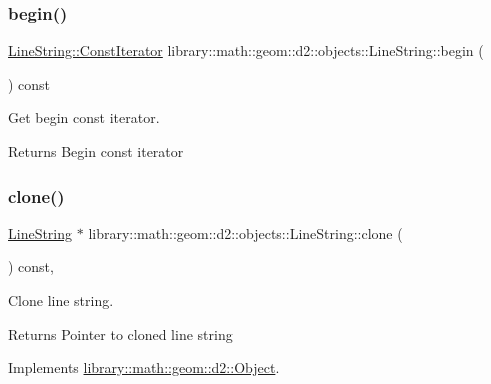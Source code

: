 \subsubsection{\texorpdfstring{begin()}{begin()}}
{\footnotesize\ttfamily \hyperlink{classlibrary_1_1math_1_1geom_1_1d2_1_1objects_1_1_line_string_a7c7a81b557da8ed855b5f4b88a5fa837}{Line\+String\+::\+Const\+Iterator} library\+::math\+::geom\+::d2\+::objects\+::\+Line\+String\+::begin (\begin{DoxyParamCaption}{ }\end{DoxyParamCaption}) const}



Get begin const iterator. 

\begin{DoxyReturn}{Returns}
Begin const iterator 
\end{DoxyReturn}
\mbox{\label{classlibrary_1_1math_1_1geom_1_1d2_1_1objects_1_1_line_string_a5b503802b279c6c305fed6a07a893ad2}} 
\subsubsection{\texorpdfstring{clone()}{clone()}}
{\footnotesize\ttfamily \hyperlink{classlibrary_1_1math_1_1geom_1_1d2_1_1objects_1_1_line_string}{Line\+String} $\ast$ library\+::math\+::geom\+::d2\+::objects\+::\+Line\+String\+::clone (\begin{DoxyParamCaption}{ }\end{DoxyParamCaption}) const\hspace{0.3cm}{\ttfamily [override]}, {\ttfamily [virtual]}}



Clone line string. 

\begin{DoxyReturn}{Returns}
Pointer to cloned line string 
\end{DoxyReturn}


Implements \hyperlink{classlibrary_1_1math_1_1geom_1_1d2_1_1_object_a5c26ae4120edb24f6463d65a9cef247d}{library\+::math\+::geom\+::d2\+::\+Object}.

\mbox{\label{classlibrary_1_1math_1_1geom_1_1d2_1_1objects_1_1_line_string_af8a783642dc4ba67d4e0ca2140cda343}} 
